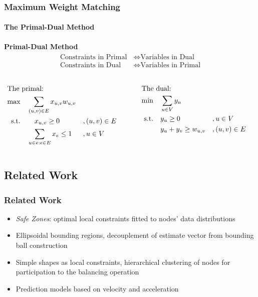 \documentclass[hyperref={pdfpagelabels=false}]{beamer}
\begin{document}
\begin{frame} \frametitle{Maximum Weight Matching}\framesubtitle{The Primal-Dual Method}
\textbf{Primal-Dual Method}
\begin{align*}
\begin{split}
\text{Constraints in Primal}&\Longleftrightarrow \text{Variables in Dual}\\
\text{Constraints in Dual}\quad &\Longleftrightarrow \text{Variables in Primal}
\end{split}
\end{align*}
\begin{columns}
\begin{column}[t]{0.49\textwidth}
\vspace{-1.5cm}
\begin{align*}
\intertext{The primal:}
\max&\quad \sum_{(u,v) \in E} x_{u,v} w_{u,v}\\
\text{s.t.} &\qquad x_{u,v}\geq 0 &&, (u,v) \in E \\
	&\quad \sum_{u \in e: e\in E} x_e \leq 1 &&, u \in V
\end{align*}\end{column}
\begin{column}[t]{0.49\textwidth}
\vspace{-1.5cm}
\begin{align*}
\intertext{The dual:}
\min&\quad \sum_{u \in V} y_u\\
\text{s.t.} &\quad y_u\geq 0 &&, u \in V\\
	&\quad y_u+y_v \geq w_{u,v} &&,(u,v) \in E
\end{align*}
\end{column}
\end{columns}
\end{frame}

\subsection{Related Work}
\begin{frame} \frametitle{Related Work}
\begin{itemize}
\item \emph{Safe Zones}: optimal local constraints fitted to nodes' data distributions %
\item Ellipsoidal bounding regions, decouplement of estimate vector from bounding ball construction%
\item Simple shapes as local constraints, hierarchical clustering of nodes for participation to the balancing operation%
\item Prediction models based on velocity and acceleration%
\end{itemize}
\end{frame}
\end{document}

